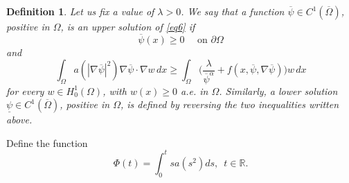 \documentclass[11pt,leqno]{amsart}
\newtheorem{proposition}[theorem]{Proposition}
\newtheorem{definition}[theorem]{Definition}
\newtheorem{remark}[theorem]{Remark}
\begin{document}
\begin{definition}\label{defsubsup}
Let us fix a value of $\lambda>0$. We say that a function $\overline\psi \in C^1(\overline{\Omega})$, positive in $\Omega$, is an upper solution of \eqref{eq6} if
$$
\overline\psi(x) \geq 0 \quad \text { on } \partial \Omega
$$
and
$$
\int_{\Omega} a\left(|\nabla \overline\psi|^2\right) \nabla \overline\psi\cdot \nabla w\, d x \geq \int_{\Omega} \Big(\frac{\lambda}{\overline\psi^{\alpha}}  +f(x,\overline\psi,\nabla \overline\psi)\Big)w\, d x
$$
for every $w \in H_0^1(\Omega)$, with $w(x) \geq 0$ a.e. in $\Omega$. Similarly, a lower solution $\underline\psi \in C^1(\overline{\Omega})$, positive in $\Omega$, is defined by reversing the two inequalities written above.
\end{definition}


Define the function 
\begin{equation}\label{Phi}
	\Phi(t)=\int_0^tsa(s^2)ds, \,\,\, t \in \mathbb{R}.
\end{equation}

%
%
\end{document}
